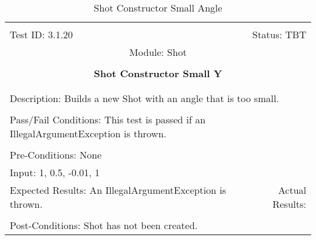 \documentclass[titlepage]{article}
\begin{document}
\begin{center}%
\begin{table}[h!]
\begin{tabular}{|l r|}\hline&\\[-2mm]
	Test ID: 3.1.20	&Status: TBT\\[-3mm]
	\multicolumn{2}{|c|}{Module: Shot}\\&\\
	\multicolumn{2}{|c|}{\textbf{\large{Shot Constructor Small Y}}}\\&\\\hline&\\[-3mm]
	\multicolumn{2}{|p{\textwidth}|}{Description: Builds a new Shot with an angle that is too small.}\\[1mm]\hline&\\[-3mm]
	\multicolumn{2}{|p{\textwidth}|}{Pass/Fail Conditions: This test is passed if an IllegalArgumentException is thrown.}\\[1mm]\hline&\\[-3mm]
	\multicolumn{2}{|p{\textwidth}|}{Pre-Conditions: None}\\[4mm]
	\multicolumn{2}{|p{\textwidth}|}{Input: 1, 0.5, -0.01, 1}\\[2mm]\hline
	\multicolumn{1}{|p{0.49\textwidth}}{Expected Results: An IllegalArgumentException is thrown.}	&\multicolumn{1}{|p{0.45\textwidth}|}{Actual Results: }\\\hline&\\[-3mm]
	\multicolumn{2}{|p{\textwidth}|}{Post-Conditions: Shot has not been created.}\\\hline
\end{tabular}
\caption{Shot Constructor Small Angle}
\end{table}
\end{center}
\end{document}
